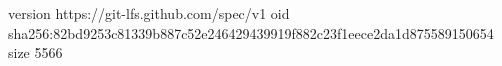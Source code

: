 version https://git-lfs.github.com/spec/v1
oid sha256:82bd9253c81339b887c52e246429439919f882c23f1eece2da1d875589150654
size 5566
